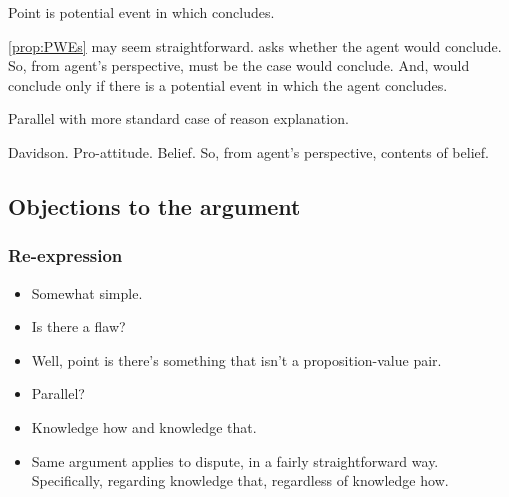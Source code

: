 \newpage

\begin{note}
  \color{blue}
  Point is potential event in which concludes.

  \autoref{prop:PWEs} may seem straightforward.
  \qzS{} asks whether the agent would conclude.
  So, from agent's perspective, must be the case would conclude.
  And, would conclude only if there is a potential event in which the agent concludes.

  Parallel with more standard case of reason explanation.

  Davidson.
  Pro-attitude.
  Belief.
  So, from agent's perspective, contents of belief.
\end{note}

\subsection{Objections to the argument}
\label{sec:objections-argument}

\subsubsection{Re-expression}
\label{sec:answers-which-are}

\begin{note}
  \begin{itemize}
  \item
    Somewhat simple.
  \item
    Is there a flaw?
  \item
    Well, point is there's something that isn't a proposition-value pair.
  \item
    Parallel?
  \item
    Knowledge how and knowledge that.
  \item
    Same argument applies to dispute, in a fairly straightforward way.
    Specifically, regarding knowledge that, regardless of knowledge how.
  \end{itemize}
\end{note}

